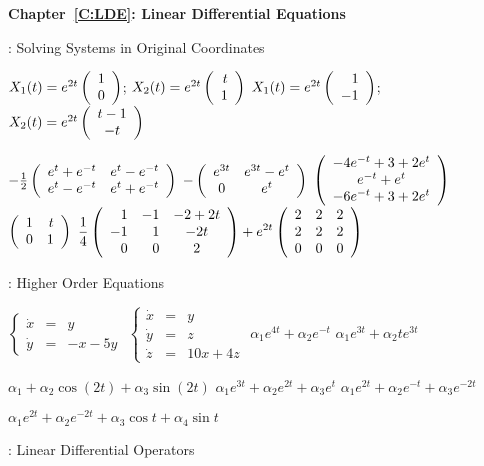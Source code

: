 \vspace{0.08in}

{\bf Chapter~\ref{C:LDE}: Linear Differential Equations}

: Solving Systems in Original Coordinates

 \ans $X_1(t) = e^{2t}\left(\begin{array}{r} 1 \\ 0\end{array}\right)$; 
$X_2(t) = e^{2t}\left(\begin{array}{r} t \\ 1\end{array}\right)$
 \ans $X_1(t) = e^{2t}\left(\begin{array}{r} 1 \\ -1\end{array}\right)$;
$X_2(t) = e^{2t}\left(\begin{array}{c} t - 1 \\ -t\end{array}\right)$

 \ans $-\frac{1}{2}\left(\begin{array}{cc} e^t + 
e^{-t} & e^t -e^{-t}\\ e^t -e^{-t} &e^t +e^{-t}\end{array}\right)$
 \ans $-\left(\begin{array}{cc} e^{3t} & e^{3t} - e^t\\ 0 &e^t\end{array}\right)$
 \ans 
$\left(\begin{array}{c} -4e^{-t} + 3 + 2e^t \\ e^{-t} + e^t \\ -6e^{-t} + 3 + 2e^t\end{array}\right)$
 \ans $\left(\begin{array}{rr} 1 & t\\ 0 &1\end{array}\right)$
 \ans $\displaystyle\frac{1}{4}\left(\begin{array}{rrc} 
1 & -1 & -2+2t\\ -1 & 1 & -2t \\ 0 & 0 & 2\end{array}\right) +e^{2t}\left(\begin{array}{rrr} 2 & 2 & 2\\  2 & 2 & 2 \\ 0 & 0 & 0 
\end{array}\right)$

: Higher Order Equations


 \ans $\left\{\begin{array}{rcl} \dot{x} & = & y \\
\dot{y} & = & -x-5y \end{array}\right.$
 \ans $\left\{\begin{array}{rcl} \dot{x} & = & y \\
\dot{y} & = & z\\
\dot{z} & = & 10x+4z \end{array}\right.$
 \ans $\alpha_1e^{4t} + \alpha_2e^{-t}$
 \ans $\alpha_1e^{3t} + \alpha_2te^{3t}$

 \ans $\alpha_1 + \alpha_2\cos(2t) + \alpha_3\sin(2t)$
 \ans $\alpha_1e^{3t} + \alpha_2e^{2t} + \alpha_3e^t$
 \ans $\alpha_1e^{2t} + \alpha_2e^{-t} + \alpha_3e^{-2t}$

 \ans $\alpha_1e^{2t} + \alpha_2e^{-2t} + \alpha_3\cos t
+ \alpha_4\sin t$

: Linear Differential Operators

